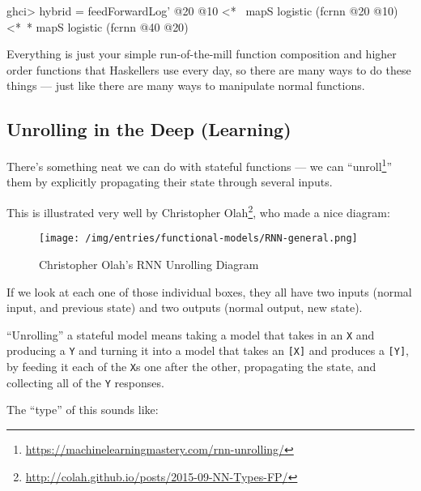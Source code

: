 \documentclass[]{article}
\newenvironment{Shaded}{}{}
\newcommand{\DecValTok}[1]{\textcolor[rgb]{0.25,0.63,0.44}{#1}}
\newcommand{\FunctionTok}[1]{\textcolor[rgb]{0.02,0.16,0.49}{#1}}
\newcommand{\NormalTok}[1]{#1}
\renewcommand{\href}[2]{#2\footnote{\url{#1}}}
\begin{document}
\begin{Shaded}
\begin{Highlighting}[]
\NormalTok{ghci}\FunctionTok{>}\NormalTok{ hybrid }\FunctionTok{=}\NormalTok{ feedForwardLog' }\FunctionTok{@}\DecValTok{20} \FunctionTok{@}\DecValTok{10}
          \FunctionTok{<*~}\NormalTok{  mapS logistic (fcrnn }\FunctionTok{@}\DecValTok{20} \FunctionTok{@}\DecValTok{10}\NormalTok{)}
          \FunctionTok{<*~*}\NormalTok{ mapS logistic (fcrnn }\FunctionTok{@}\DecValTok{40} \FunctionTok{@}\DecValTok{20}\NormalTok{)}
\end{Highlighting}
\end{Shaded}

Everything is just your simple run-of-the-mill function composition and higher
order functions that Haskellers use every day, so there are many ways to do
these things --- just like there are many ways to manipulate normal functions.

\hypertarget{unrolling-in-the-deep-learning}{%
\subsection{Unrolling in the Deep
(Learning)}\label{unrolling-in-the-deep-learning}}

There's something neat we can do with stateful functions --- we can
``\href{https://machinelearningmastery.com/rnn-unrolling/}{unroll}'' them by
explicitly propagating their state through several inputs.

This is illustrated very well by
\href{http://colah.github.io/posts/2015-09-NN-Types-FP/}{Christopher Olah}, who
made a nice diagram:

\begin{figure}
\centering
\texttt{[image: /img/entries/functional-models/RNN-general.png]}
\caption{Christopher Olah's RNN Unrolling Diagram}
\end{figure}

If we look at each one of those individual boxes, they all have two inputs
(normal input, and previous state) and two outputs (normal output, new state).

``Unrolling'' a stateful model means taking a model that takes in an \texttt{X}
and producing a \texttt{Y} and turning it into a model that takes an
\texttt{{[}X{]}} and produces a \texttt{{[}Y{]}}, by feeding it each of the
\texttt{X}s one after the other, propagating the state, and collecting all of
the \texttt{Y} responses.

The ``type'' of this sounds like:
\end{document}
